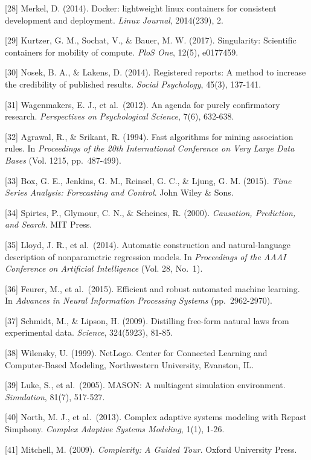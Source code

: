 \documentclass[
]{article}
\begin{document}
{[}28{]} Merkel, D. (2014). Docker: lightweight linux containers for
consistent development and deployment. \emph{Linux Journal}, 2014(239),
2.

{[}29{]} Kurtzer, G. M., Sochat, V., \& Bauer, M. W. (2017).
Singularity: Scientific containers for mobility of compute. \emph{PloS
One}, 12(5), e0177459.

{[}30{]} Nosek, B. A., \& Lakens, D. (2014). Registered reports: A
method to increase the credibility of published results. \emph{Social
Psychology}, 45(3), 137-141.

{[}31{]} Wagenmakers, E. J., et al.~(2012). An agenda for purely
confirmatory research. \emph{Perspectives on Psychological Science},
7(6), 632-638.

{[}32{]} Agrawal, R., \& Srikant, R. (1994). Fast algorithms for mining
association rules. In \emph{Proceedings of the 20th International
Conference on Very Large Data Bases} (Vol. 1215, pp.~487-499).

{[}33{]} Box, G. E., Jenkins, G. M., Reinsel, G. C., \& Ljung, G. M.
(2015). \emph{Time Series Analysis: Forecasting and Control}. John Wiley
\& Sons.

{[}34{]} Spirtes, P., Glymour, C. N., \& Scheines, R. (2000).
\emph{Causation, Prediction, and Search}. MIT Press.

{[}35{]} Lloyd, J. R., et al.~(2014). Automatic construction and
natural-language description of nonparametric regression models. In
\emph{Proceedings of the AAAI Conference on Artificial Intelligence}
(Vol. 28, No.~1).

{[}36{]} Feurer, M., et al.~(2015). Efficient and robust automated
machine learning. In \emph{Advances in Neural Information Processing
Systems} (pp.~2962-2970).

{[}37{]} Schmidt, M., \& Lipson, H. (2009). Distilling free-form natural
laws from experimental data. \emph{Science}, 324(5923), 81-85.

{[}38{]} Wilensky, U. (1999). NetLogo. Center for Connected Learning and
Computer-Based Modeling, Northwestern University, Evanston, IL.

{[}39{]} Luke, S., et al.~(2005). MASON: A multiagent simulation
environment. \emph{Simulation}, 81(7), 517-527.

{[}40{]} North, M. J., et al.~(2013). Complex adaptive systems modeling
with Repast Simphony. \emph{Complex Adaptive Systems Modeling}, 1(1),
1-26.

{[}41{]} Mitchell, M. (2009). \emph{Complexity: A Guided Tour}. Oxford
University Press.
\end{document}
